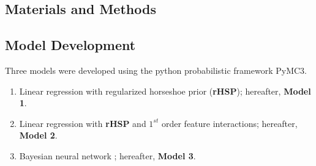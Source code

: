 \documentclass[a0,portrait]{a0poster}
\begin{document}
\begin{multicols}{2}
\section*{Materials and Methods}

\subsection*{Model Development}
Three models were developed using the python probabilistic framework PyMC3\cite{Salvatier:2016}.
\begin{enumerate}
    \item Linear regression with regularized horseshoe prior (\textbf{rHSP})\cite{Vehtari:2017b}; hereafter, \textbf{Model 1}.
    \item Linear regression with \textbf{rHSP} and $1^{st}$ order feature interactions; hereafter, \textbf{Model 2}.
    \item Bayesian neural network \cite{Neal:1996bnn}; hereafter, \textbf{Model 3}.
\end{enumerate}
\begin{center}

\end{center}
\end{multicols}
\end{document}
